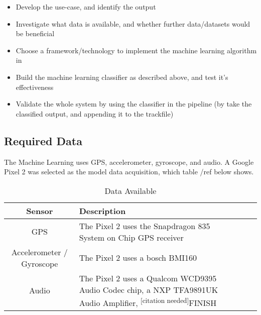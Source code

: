 \documentclass{UoNMCHA}
\newcommand{\citationneeded}{\textsuperscript{\color{blue} [citation needed]}}
\numberwithin{equation}{section}
\begin{document}
\begin{itemize}
    \item Develop the use-case, and identify the output
    \item Investigate what data is available, and whether further data/datasets would be beneficial
    \item Choose a framework/technology to implement the machine learning algorithm in
    \item Build the machine learning classifier as described above, and test it's effectiveness
    \item Validate the whole system by using the classifier in the pipeline (by take the classified output, and appending it to the trackfile)
\end{itemize}




\subsection{Required Data}
The Machine Learning uses GPS, accelerometer, gyroscope, and audio. A Google Pixel 2 was selected as the model data acquisition, which table /ref{} below shows.
\begin{table}[h!] 
    \begin{center}
        \caption{Data Available \cite{pixelteardown}}\label{tab:AndroidSensorsAvailable}
        {\footnotesize
            \begin{tabular}{clll}
                \hline\hline Sensor & Description \\ \hline 
                GPS & The Pixel 2 uses the Snapdragon 835 System on Chip GPS receiver\\
                Accelerometer / Gyroscope & The Pixel 2 uses a bosch BMI160 \\
                Audio & The Pixel 2 uses a Qualcom WCD9395 Audio Codec chip, a NXP TFA9891UK Audio Amplifier, \citationneeded FINISH \\ \hline
            \end{tabular}
        }
    \end{center}
\end{table}
\end{document}
